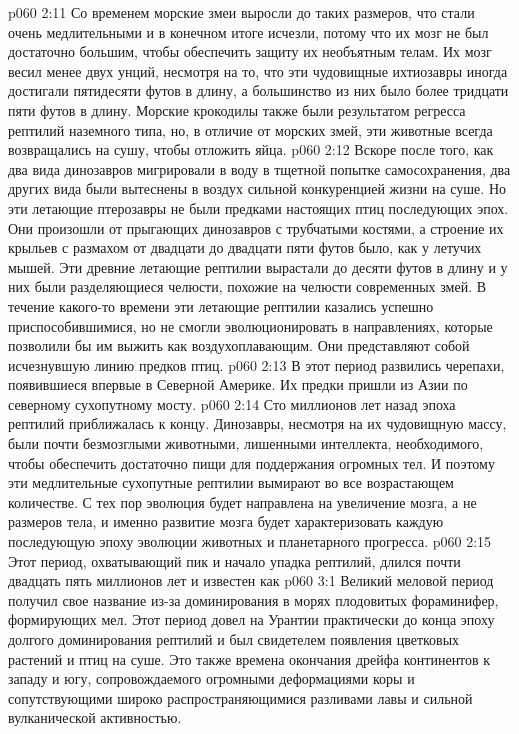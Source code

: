 \vs p060 2:11 Со временем морские змеи выросли до таких размеров, что стали очень медлительными и в конечном итоге исчезли, потому что их мозг не был достаточно большим, чтобы обеспечить защиту их необъятным телам. Их мозг весил менее двух унций, несмотря на то, что эти чудовищные ихтиозавры иногда достигали пятидесяти футов в длину, а большинство из них было более тридцати пяти футов в длину. Морские крокодилы также были результатом регресса рептилий наземного типа, но, в отличие от морских змей, эти животные всегда возвращались на сушу, чтобы отложить яйца.
\vs p060 2:12 Вскоре после того, как два вида динозавров мигрировали в воду в тщетной попытке самосохранения, два других вида были вытеснены в воздух сильной конкуренцией жизни на суше. Но эти летающие птерозавры не были предками настоящих птиц последующих эпох. Они произошли от прыгающих динозавров с трубчатыми костями, а строение их крыльев с размахом от двадцати до двадцати пяти футов было, как у летучих мышей. Эти древние летающие рептилии вырастали до десяти футов в длину и у них были разделяющиеся челюсти, похожие на челюсти современных змей. В течение какого\hyp{}то времени эти летающие рептилии казались успешно приспособившимися, но не смогли эволюционировать в направлениях, которые позволили бы им выжить как воздухоплавающим. Они представляют собой исчезнувшую линию предков птиц.
\vs p060 2:13 В этот период развились черепахи, появившиеся впервые в Северной Америке. Их предки пришли из Азии по северному сухопутному мосту.
\vs p060 2:14 \pc Сто миллионов лет назад эпоха рептилий приближалась к концу. Динозавры, несмотря на их чудовищную массу, были почти безмозглыми животными, лишенными интеллекта, необходимого, чтобы обеспечить достаточно пищи для поддержания огромных тел. И поэтому эти медлительные сухопутные рептилии вымирают во все возрастающем количестве. С тех пор эволюция будет направлена на увеличение мозга, а не размеров тела, и именно развитие мозга будет характеризовать каждую последующую эпоху эволюции животных и планетарного прогресса.
\vs p060 2:15 \pc Этот период, охватывающий пик и начало упадка рептилий, длился почти двадцать пять миллионов лет и известен как 
\vs p060 3:1 Великий меловой период получил свое название из\hyp{}за доминирования в морях плодовитых фораминифер, формирующих мел. Этот период довел на Урантии практически до конца эпоху долгого доминирования рептилий и был свидетелем появления цветковых растений и птиц на суше. Это также времена окончания дрейфа континентов к западу и югу, сопровождаемого огромными деформациями коры и сопутствующими широко распространяющимися разливами лавы и сильной вулканической активностью.
